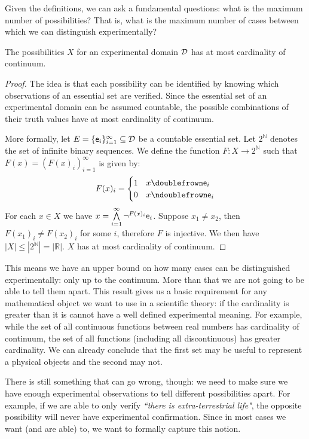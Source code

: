 \documentclass[11pt,letterpaper,fleqn]{memoir} %
\begin{document}
Given the definitions, we can ask a fundamental questions: what is the maximum number of possibilities? That is, what is the maximum number of cases between which we can distinguish experimentally?

\begin{mathSection}
	\begin{prop}
		The possibilities $X$ for an experimental domain $\edomain$ has at most cardinality of continuum.
	\end{prop}
	
	\begin{proof}
		The idea is that each possibility can be identified by knowing which observations of an essential set are verified. Since the essential set of an experimental domain can be assumed countable, the possible combinations of their truth values have at most cardinality of continuum.
		
		More formally, let $E = \{\obs[e]_i\}_{i=1}^{\infty} \subseteq \edomain$ be a countable essential set. Let $2^{\mathbb{N}}$ denotes the set of infinite binary sequences. We define the function $F:X\to2^{\mathbb{N}}$ such that $F(x) = (F(x)_i)_{i=1}^{\infty}$ is given by: 
		$$
		F(x)_i = 
		\begin{cases}
		1 & x \comp \obs[e]_i \\
		0 & x \ncomp \obs[e]_i
		\end{cases}
		$$
		For each $x \in X$ we have $x = \bigAND\limits_{i=1}^{\infty} \NOT^{F(x)_i} \obs[e]_i$. Suppose $x_1 \neq x_2$, then $F(x_1)_i \neq F(x_2)_i$ for some $i$, therefore $F$ is injective. We then have $|X| \leq |2^{\mathbb{N}}|=|\mathbb{R}|$. $X$ has at most cardinality of continuum.
	\end{proof}
\end{mathSection}

This means we have an upper bound on how many cases can be distinguished experimentally: only up to the continuum. More than that we are not going to be able to tell them apart. This result gives us a basic requirement for any mathematical object we want to use in a scientific theory: if the cardinality is greater than it is cannot have a well defined experimental meaning. For example, while the set of all continuous functions between real numbers has cardinality of continuum, the set of all functions (including all discontinuous) has greater cardinality. We can already conclude that the first set may be useful to represent a physical objects and the second may not.

There is still something that can go wrong, though: we need to make sure we have enough experimental observations to tell different possibilities apart. For example, if we are able to only verify \emph{``there is extra-terrestrial life"}, the opposite possibility will never have experimental confirmation. Since in most cases we want (and are able) to, we want to formally capture this notion.
\end{document}
